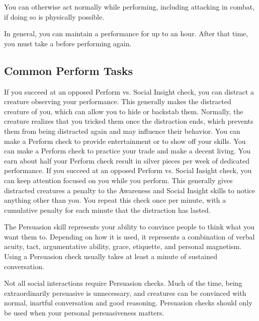             You can otherwise act normally while performing, including attacking in combat, if doing so is physically possible.

        In general, you can maintain a performance for up to an hour.
        After that time, you must take a  before performing again.

    \subsection{Common Perform Tasks}
         If you succeed at an opposed Perform vs. Social Insight check, you can distract a creature observing your performance.
        This generally makes the distracted creature  \partiallyunaware of you, which can allow you to hide or backstab them.
        Normally, the creature realizes that you tricked them once the distraction ends, which prevents them from being distracted again and may influence their behavior.
         You can make a Perform check to provide entertainment or to show off your skills.
         You can make a Perform check to practice your trade and make a decent living.
        You earn about half your Perform check result in silver pieces per week of dedicated performance.
         If you succeed at an opposed Perform vs. Social Insight check, you can keep attention focused on you while you perform.
        This generally gives distracted creatures a  penalty to the Awareness and Social Insight skills to notice anything other than you.
        You repeat this check once per minute, with a cumulative  penalty for each minute that the distraction has lasted.

\newpage
{}
        The Persuasion skill represents your ability to convince people to think what you want them to.
        Depending on how it is used, it represents a combination of verbal acuity, tact, argumentative ability, grace, etiquette, and personal magnetism.
        Using a Persuasion check usually takes at least a minute of sustained conversation.

        Not all social interactions require Persuasion checks. Much of the time, being extraordinarily persuasive is unnecessary, and creatures can be convinced with normal, inartful conversation and good reasoning. Persuasion checks should only be used when your personal persuasiveness matters.

